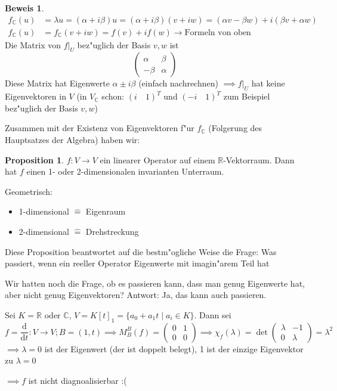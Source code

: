 \documentclass[oneside,fontsize=11pt,paper=a4,BCOR=0mm,DIV=12,automark,headsepline]{scrbook}
\newcommand{\gq}[1]{\glqq{}#1\grqq{}} %
\theoremstyle{remark}
\theoremstyle{definition}
\newtheorem*{proposition}{Proposition}
\theoremstyle{definition}
\newtheorem*{prof}{Beweis}
\theoremstyle{remark}
\begin{document}
\begin{prof}
  \begin{align*}
    f_{\mathbb{C}}(u) &= \lambda u = (\alpha + i \beta) u = (\alpha + i\beta)(v + iw) = (\alpha v - \beta w) + i(\beta v + \alpha w)\\
    f_{\mathbb{C}}(u) &= f_{\mathbb{C}}(v+iw) = f(v) + if(w) \rightarrow \text{Formeln von oben}
  \end{align*}
  Die Matrix von \(f|_U\) bez"uglich der Basis \(v, w\) ist
  \[
    \begin{pmatrix}
      \alpha & \beta \\
      -\beta & \alpha
    \end{pmatrix}
  \]
  Diese Matrix hat Eigenwerte \(\alpha \pm i\beta\) (einfach nachrechnen) \(\implies f|_U\) hat keine Eigenvektoren in \(V\) (in \(V_{\mathbb{C}}\) schon: \((i\quad 1)^T\) und \((-i\quad 1)^T\) zum Beispiel bez"uglich der Basis \(v, w\))
\end{prof}

Zusammen mit der Existenz von Eigenvektoren f"ur $f_{\mathbb{C}}$ (Folgerung des Hauptsatzes der Algebra) haben wir:

\begin{proposition}
  \(f: V\to V\) ein linearer Operator auf einem $\mathbb{R}$-Vektorraum. Dann hat $f$ einen 1-
  oder 2-dimensionalen invarianten Unterraum.
\end{proposition}

\begin{relation}
  Geometrisch:
  \begin{itemize}
  \item 1-dimensional \(\hat{=}\) Eigenraum
  \item 2-dimensional \(\hat{=}\) Drehstreckung
  \end{itemize}
\end{relation}

Diese Proposition beantwortet auf die bestm"ogliche Weise die Frage: \gq{Was
passiert, wenn ein reeller Operator Eigenwerte mit imagin"arem Teil hat}

\begin{exa}
  Wir hatten noch die Frage, ob es passieren kann, dass man \gq{genug} Eigenwerte hat, aber nicht genug Eigenvektoren? Antwort: Ja, das kann auch passieren.

  Sei \(K = \mathbb{R}\) oder \(\mathbb{C}\), \(V = K[t]_1 = \{a_0 + a_1 t\mid a_i\in K\}\). Dann sei
  \[f = \frac{\text{d}}{\text{d}t}: V\to V; B = (1, t) \implies M^B_B(f) =
    \begin{pmatrix}
      0 & 1 \\
      0 & 0
    \end{pmatrix}
   \implies \chi_f(\lambda) = \det
   \begin{pmatrix}
     \lambda & -1 \\
     0 & \lambda
   \end{pmatrix} = \lambda^2
\] \(\implies \lambda = 0\) ist der Eigenwert (der ist doppelt belegt), 1 ist der einzige Eigenvektor zu \(\lambda = 0\)

  \(\implies f\) ist nicht diagnoalisierbar :(
\end{exa}
\end{document}
